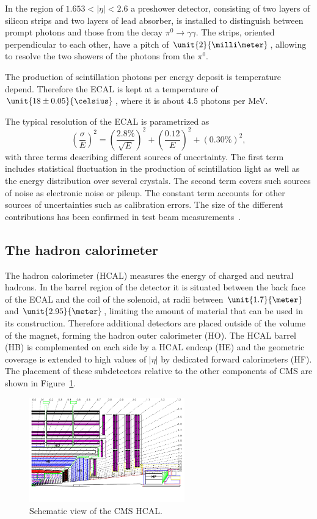 In the region of $1.653 < \vert \eta \vert < 2.6$ a preshower detector, consisting of two layers of silicon strips and two layers of lead absorber, is installed to distinguish between prompt photons and those from the decay $\pi^0 \rightarrow \gamma\gamma$. The strips, oriented perpendicular to each other, have a pitch of $\unit{2}{\milli\meter}$, allowing to resolve the two showers of the photons from the $\pi^0$. 

The production of scintillation photons per energy deposit is temperature depend. Therefore the ECAL is kept at a temperature of $\unit{18\pm0.05}{\celsius}$, where it is about 4.5 photons per MeV. 

The typical resolution of the ECAL is parametrized as
\begin{equation}
\left(\frac{\sigma}{E}\right)^2 = \left( \frac{2.8\%}{\sqrt{E}}\right)^2 + \left( \frac{0.12}{E} \right)^2 + (0.30\%)^2,
\end{equation}
with three terms describing different sources of uncertainty. The first term includes statistical fluctuation in the production of scintillation light as well as the energy distribution over several crystals. The second term covers such sources of noise as electronic noise or pileup. The constant term accounts for other sources of uncertainties such as calibration errors. The size of the different contributions has been confirmed in test beam measurements~\cite{EGM-10-003}. 
\subsection{The hadron calorimeter}
The hadron calorimeter (HCAL) measures the energy of charged and neutral hadrons. In the barrel region of the detector it is situated between the back face of the ECAL and the coil of the solenoid, at radii between $\unit{1.7}{\meter}$ and $\unit{2.95}{\meter}$, limiting the amount of material that can be used in its construction. Therefore additional detectors are placed outside of the volume of the magnet, forming the hadron outer calorimeter (HO). The HCAL barrel (HB) is complemented on each side by a HCAL endcap (HE) and the geometric coverage is extended to high values of $\vert \eta \vert$ by dedicated forward calorimeters (HF). The placement of these subdetectors relative to the other components of CMS are shown in Figure~\ref{fig:HCAL}.
\begin{figure}[htbp]
\centering
  \includegraphics[width=0.6\textwidth]{plots/CMS/HCAL.png}
\caption{Schematic view of the CMS HCAL.}
\label{fig:HCAL}
\end{figure} 
